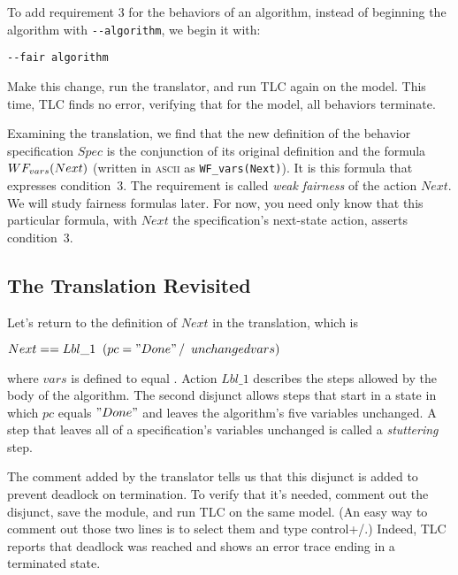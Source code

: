To add requirement 3 for the behaviors of an algorithm, 
instead of beginning the algorithm with \texttt{-{}-algorithm},
we begin it with:
\begin{display}
\tt -\mbox{}-fair algorithm
\end{display}
Make this change, run the translator, and run TLC again on the model.
This time, TLC finds no error, verifying that for the model, all
behaviors terminate.

Examining the translation, we find that the new definition of 
the behavior specification $Spec$
is the conjunction of its original definition and the formula
$\WF_{vars}(Next)$ (written in \textsc{ascii} as \verb|WF_vars(Next)|).
It is this formula that expresses condition~3.  The requirement is
called 
\emph{weak fairness} of the action $Next$.  We will study
fairness formulas later.  For now, you need only know that this
particular formula, with $Next$ the specification's next-state action,
asserts condition~3.%


\subsection{The Translation Revisited}

Let's return to the definition of $Next$ in the translation, which is
\begin{display}
$Next == Lbl\_1 \; \/ \; (pc = "Done" \, /\ \, \UNCHANGED vars)$
\end{display}
where $vars$ is defined to equal 
 .  
Action $Lbl\_1$ describes the steps allowed by the body of the
algorithm.  The second disjunct allows steps that start in a state in
which $pc$ equals $"Done"$ and leaves the algorithm's five variables
unchanged.  A step that leaves all of a specification's variables
unchanged is called a
\emph{stuttering} step.  

The comment added by the translator tells us that this disjunct is
added to prevent deadlock on termination.  To verify that it's needed,
comment out the disjunct, save the module, and run TLC on the same
model.  (An easy way to comment out those two lines is to select
them and type \textsf{control+/}.)  Indeed, TLC reports that deadlock
was reached and shows an error trace ending in a terminated state.

